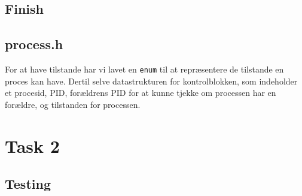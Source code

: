 \documentclass[a4paper,12pt]{article}
\begin{document}
\subsection*{Finish}


\subsection*{process.h}
For at have tilstande har vi lavet en \texttt{enum} til at repræsentere de tilstande en proces kan have. Dertil selve datastrukturen for kontrolblokken, som indeholder et procesid, PID, forældrens PID for at kunne tjekke om processen har en forældre, og tilstanden for processen.


\section*{Task 2}

\subsection*{Testing}
\end{document}
